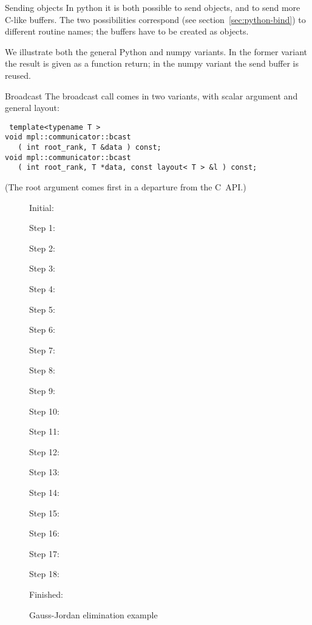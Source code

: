 \begin{pythonnote}{Sending objects}
  In python it is both possible to send objects, and to send more
  C-like buffers. The two possibilities correspond (see
  section~\ref{sec:python-bind}) to different routine names; the
  buffers have to be created as  objects.

  We illustrate both the general Python and numpy variants. 
  In the former variant the result is given as a function return;
  in the numpy variant the send buffer is reused.

\end{pythonnote}

\begin{mplnote}{Broadcast}
  The broadcast call comes in two variants, with scalar argument
  and general layout:
\begin{lstlisting}
 template<typename T >
void mpl::communicator::bcast
   ( int root_rank, T &data ) const;
void mpl::communicator::bcast
   ( int root_rank, T *data, const layout< T > &l ) const;
\end{lstlisting}
(The root argument comes first
in a departure from the C~\ac{API}.)
\end{mplnote}

\begin{figure}[p]
  \tiny
  \begin{multicols}{3}
    Initial:\\ \nobreak
    
    Step 1:\\ \nobreak
    
    Step 2:\\ \nobreak
    
    Step 3:\\ \nobreak
    
    Step 4:\\ \nobreak
    
    Step 5:\\ \nobreak
    
    Step 6:\\ \nobreak
    
    Step 7:\\ \nobreak
    
    Step 8:\\ \nobreak
    
    Step 9:\\ \nobreak
    
    Step 10:\\ \nobreak
    
    Step 11:\\ \nobreak
    
    Step 12:\\ \nobreak
    
    Step 13:\\ \nobreak
    
    Step 14:\\ \nobreak
    
    Step 15:\\ \nobreak
    
    Step 16:\\ \nobreak
    
    Step 17:\\ \nobreak
    
    Step 18:\\ \nobreak
    
    Finished:\\ \nobreak
    
  \end{multicols}
  \caption{Gauss-Jordan elimination example}
  \label{fig:gauss-jordan-ex}
\end{figure}

